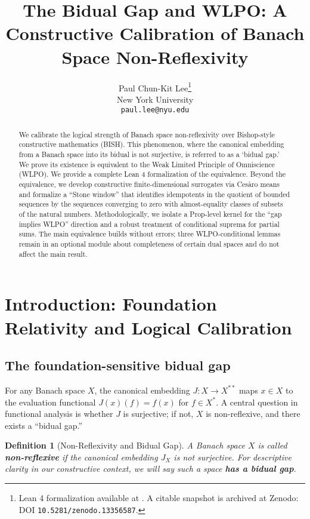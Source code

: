 \documentclass[11pt]{article}  %
\title{The Bidual Gap and WLPO: A Constructive Calibration of Banach Space Non-Reflexivity}
\author{Paul Chun-Kit Lee\thanks{Lean 4 formalization available at \leanRepo. A citable snapshot is archived at Zenodo: DOI \texttt{10.5281/zenodo.13356587}.} \\ New York University \\ \texttt{paul.lee@nyu.edu}}
\date{}
\newtheorem{definition}[theorem]{Definition}
\newtheorem{definition}[theorem]{Definition}
\begin{document}
\begin{abstract}
We calibrate the logical strength of Banach space non-reflexivity over Bishop-style constructive mathematics (BISH). This phenomenon, where the canonical embedding from a Banach space into its bidual is not surjective, is referred to as a `bidual gap.' We prove its existence is equivalent to the Weak Limited Principle of Omniscience (WLPO). We provide a complete Lean 4 formalization of the equivalence. Beyond the equivalence, we develop constructive finite-dimensional surrogates via Cesàro means and formalize a ``Stone window'' that identifies idempotents in the quotient of bounded sequences by the sequences converging to zero with almost-equality classes of subsets of the natural numbers. Methodologically, we isolate a Prop-level kernel for the ``gap implies WLPO'' direction and a robust treatment of conditional suprema for partial sums. The main equivalence builds without errors; three WLPO-conditional lemmas remain in an optional module about completeness of certain dual spaces and do not affect the main result.
\end{abstract}

\maketitle

\tableofcontents

\section{Introduction: Foundation Relativity and Logical Calibration}

\subsection{The foundation-sensitive bidual gap}

For any Banach space $X$, the canonical embedding $J:X\to X^{**}$ maps $x\in X$ to the evaluation functional $J(x)(f)=f(x)$ for $f\in X^*$. A central question in functional analysis is whether $J$ is surjective; if not, $X$ is non-reflexive, and there exists a ``bidual gap.''

\begin{definition}[Non-Reflexivity and Bidual Gap]
A Banach space $X$ is called \textbf{non-reflexive} if the canonical embedding $J_X$ is not surjective. For descriptive clarity in our constructive context, we will say such a space \textbf{has a bidual gap}.
\end{definition}
\end{document}
